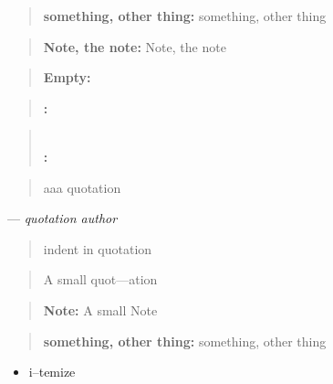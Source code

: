 \documentclass{book}
\begin{document}
\begin{quote}
\textbf{something, other thing:} something, other thing
\end{quote}

\begin{quote}
\textbf{Note, the note:} Note, the note
\end{quote}

\begin{quote}
\end{quote}

\begin{quote}
\textbf{Empty:} \end{quote}

\begin{quote}
\textbf{:} \end{quote}

\begin{quote}
\textbf{\leavevmode{}\\:} \end{quote}

\begin{quote}
aaa quotation
\end{quote}
\begin{center}
--- \emph{quotation author}
\end{center}

\begin{quote}
indent in quotation
\end{quote}

\begin{quote}
\begin{footnotesize}
A small quot---ation
\end{footnotesize}
\end{quote}

\begin{quote}
\begin{footnotesize}
\textbf{Note:} A small Note
\end{footnotesize}
\end{quote}

\begin{quote}
\begin{footnotesize}
\textbf{something, other thing:} something, other thing
\end{footnotesize}
\end{quote}

\begin{itemize}
\item i--temize
\end{itemize}
\end{document}
